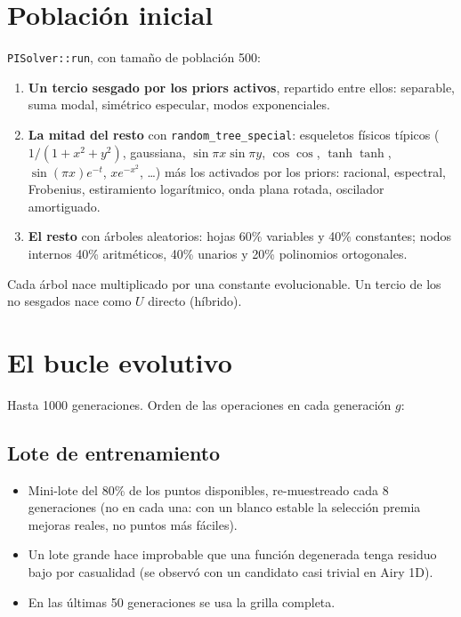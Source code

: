 \documentclass[11pt,a4paper]{article}
\newcommand{\code}[1]{\texttt{\small #1}}
\begin{document}
\section{Población inicial}
\code{PISolver::run}, con tamaño de población 500:
\begin{enumerate}
\item \textbf{Un tercio sesgado por los priors activos}, repartido entre ellos: separable, suma modal,
  simétrico especular, modos exponenciales.
\item \textbf{La mitad del resto} con \code{random\_tree\_special}: esqueletos físicos típicos
  ($1/(1+x^2+y^2)$, gaussiana, $\sin\pi x\sin\pi y$, $\cos\cos$, $\tanh\tanh$, $\sin(\pi x)e^{-t}$,
  $xe^{-x^2}$, \dots) más los activados por los priors: racional, espectral, Frobenius, estiramiento
  logarítmico, onda plana rotada, oscilador amortiguado.
\item \textbf{El resto} con árboles aleatorios: hojas 60\% variables y 40\% constantes; nodos internos
  40\% aritméticos, 40\% unarios y 20\% polinomios ortogonales.
\end{enumerate}
Cada árbol nace multiplicado por una constante evolucionable. Un tercio de los no sesgados nace como
$U$ directo (híbrido).

\section{El bucle evolutivo}
Hasta 1000 generaciones. Orden de las operaciones en cada generación $g$:

\subsection{Lote de entrenamiento}
\begin{itemize}
\item Mini-lote del 80\% de los puntos disponibles, re-muestreado cada 8 generaciones (no en cada una:
  con un blanco estable la selección premia mejoras reales, no puntos más fáciles).
\item Un lote grande hace improbable que una función degenerada tenga residuo bajo por casualidad
  (se observó con un candidato casi trivial en Airy 1D).
\item En las últimas 50 generaciones se usa la grilla completa.
\end{itemize}
\end{document}
